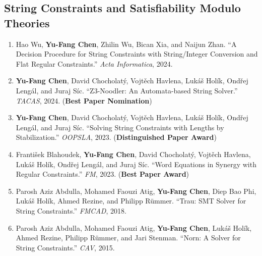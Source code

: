 \documentclass[11pt,a4paper]{article}
\newcommand{\myname}{\textbf{Yu-Fang Chen}}
\begin{document}
\subsection*{String Constraints and Satisfiability Modulo Theories}
\begin{enumerate}[leftmargin=1.6em,itemsep=0.45em,resume]
  \item Hao Wu, \myname, Zhilin Wu, Bican Xia, and Naijun Zhan.
  ``A Decision Procedure for String Constraints with String/Integer Conversion
  and Flat Regular Constraints.'' \emph{Acta Informatica}, 2024.

  \item \myname, David Chocholatý, Vojtěch Havlena, Lukáš Holík,
  Ondřej Lengál, and Juraj Síc.
  ``Z3-Noodler: An Automata-based String Solver.''
  \emph{TACAS}, 2024. (\textbf{Best Paper Nomination})

  \item \myname, David Chocholatý, Vojtěch Havlena, Lukáš Holík,
  Ondřej Lengál, and Juraj Síc.
  ``Solving String Constraints with Lengths by Stabilization.''
  \emph{OOPSLA}, 2023. (\textbf{Distinguished Paper Award})

  \item František Blahoudek, \myname, David Chocholatý, Vojtěch Havlena,
  Lukáš Holík, Ondřej Lengál, and Juraj Síc.
  ``Word Equations in Synergy with Regular Constraints.''
  \emph{FM}, 2023. (\textbf{Best Paper Award})

  \item Parosh Aziz Abdulla, Mohamed Faouzi Atig, \myname, Diep Bao Phi,
  Lukáš Holík, Ahmed Rezine, and Philipp Rümmer.
  ``Trau: SMT Solver for String Constraints.''
  \emph{FMCAD}, 2018.

  \item Parosh Aziz Abdulla, Mohamed Faouzi Atig, \myname, Lukáš Holík,
  Ahmed Rezine, Philipp Rümmer, and Jari Stenman.
  ``Norn: A Solver for String Constraints.''
  \emph{CAV}, 2015.
\end{enumerate}
\end{document}
